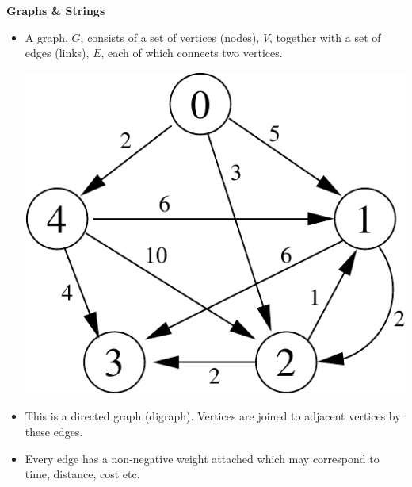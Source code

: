 \documentclass[a4,portraitt]{slides}
\begin{document}
\newpage
{\samepage
\begin{center}
{\Large{\bf Graphs \& Strings}}
\end{center}
\begin{itemize}
\item A graph, $G$, consists of a set of vertices (nodes), $V$, together
with a set of edges (links), $E$, each of which connects two vertices.
\begin{center}
\includegraphics{../Images/grapha.pdf}
\end{center}
\item This is a directed graph (digraph).
Vertices are joined to adjacent vertices by these edges.
\item Every edge has a non-negative weight attached
which may correspond to time, distance, cost etc.
\end{itemize}
}
\end{document}
